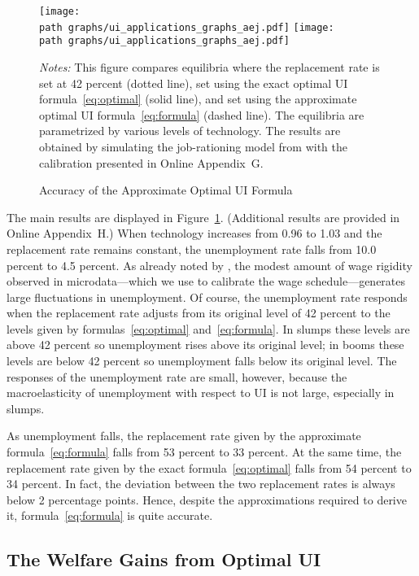 \documentclass[letterpaper,12pt,leqno]{article}
\def\path{../}
\newcommand{\fignotes}[1]{\centering\parbox[c]{\textwidth}{\footnotesize \textit{Notes:} #1}}
\begin{document}
\begin{figure}[t] \centering
\texttt{[image: \\path graphs/ui\_applications\_graphs\_aej.pdf]}\quad
\texttt{[image: \\path graphs/ui\_applications\_graphs\_aej.pdf]}
\caption{Accuracy of the Approximate Optimal UI Formula}
\fignotes{This figure compares equilibria where the replacement rate is set at 42 percent (dotted line), set using the exact optimal UI formula~\eqref{eq:optimal} (solid line), and set using the approximate optimal UI formula~\eqref{eq:formula} (dashed line). The equilibria are parametrized by various levels of technology. The results are obtained by simulating the job-rationing model from \citet{M09} with the calibration presented in Online Appendix~G.}
\label{fig:UI}\end{figure}

The main results are displayed in Figure~\ref{fig:UI}. (Additional results are provided in Online Appendix~H.) When technology increases from 0.96 to 1.03 and the replacement rate remains constant, the unemployment rate falls from 10.0 percent to 4.5 percent. As already noted by \citet{M09}, the modest amount of wage rigidity observed in microdata---which we use to calibrate the wage schedule---generates large fluctuations in unemployment. Of course, the unemployment rate responds when the replacement rate adjusts from its original level of 42 percent to the levels given by formulas~\eqref{eq:optimal} and~\eqref{eq:formula}. In slumps these levels are above 42 percent so unemployment rises above its original level; in booms these levels are below 42 percent so unemployment falls below its original level. The responses of the unemployment rate are small, however, because the macroelasticity of unemployment with respect to UI is not large, especially in slumps.

As unemployment falls, the replacement rate given by the approximate formula~\eqref{eq:formula} falls from 53 percent to 33 percent. At the same time, the replacement rate given by the exact formula~\eqref{eq:optimal} falls from 54 percent to 34 percent. In fact, the deviation between the two replacement rates is always below 2 percentage points. Hence, despite the approximations required to derive it, formula~\eqref{eq:formula} is quite accurate.

\subsection{The Welfare Gains from Optimal UI}
\end{document}
